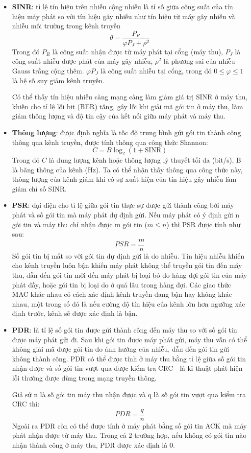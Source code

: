 \documentclass{uetgraduation}
\begin{document}
\begin{itemize}
    \item \textbf{SINR}: tỉ lệ tín hiệu trên nhiễu cộng nhiễu là tỉ số giữa công suất của tín hiệu máy phát so với tín hiệu gây nhiễu như
    tín hiệu từ máy gây nhiễu và nhiễu môi trường trong kênh truyền
    \[
    \theta = \frac{P_R}{\varphi P_J + \rho^2}
    \]
    Trong đó $P_R$ là công suất nhận được từ máy phát tại cổng (máy thu), $P_J$ là công suất nhiễu được phát của máy gây nhiễu, $\rho^2$ là phương sai
    của nhiễu Gauss trắng cộng thêm. $\varphi P_J$ là công suất nhiễu tại cổng, trong đó $0 \leq \varphi \leq 1$ là hệ số suy giảm kênh truyền.

    Có thể thấy tín hiệu nhiễu càng mạng càng làm giảm giá trị SINR ở máy thu, khiến cho tỉ lệ lỗi bit (BER) tăng, gây lỗi khi giải mã gói tin ở máy thu,
    làm giảm thông lượng và độ tin cậy của kết nối giữa máy phát và máy thu.
    \item \textbf{Thông lượng}: được định nghĩa là tốc độ trung bình gửi gói tin thành công thông qua kênh truyền, được tính thông qua công thức Shannon:
    \[
    C = B \log_2(1 + \text{SINR})
    \]
    Trong đó $C$ là dung lượng kênh hoặc thông lượng lý thuyết tối đa (bit/s), B là băng thông của kênh (Hz). Ta có thể nhận thấy thông qua công thức này,
    thông lượng của kênh giảm khi có sự xuất hiện của tín hiệu gây nhiễu làm giảm chỉ số SINR.
    \item \textbf{PSR}: đại diện cho tỉ lệ giữa gói tin thực sự được gửi thành công bởi máy phát và số gói tin mà máy phát dự định gửi. Nếu máy phát có ý
    định gửi n gói tin và máy thu chỉ nhận được m gói tin ($m \leq n$) thì PSR được tính như sau:
    \[
    PSR = \frac{m}{n}
    \]
    Số gói tin bị mất so với gói tin dự định gửi là do nhiễu. Tín hiệu nhiễu khiến cho kênh truyền luôn bận khiến máy phát không thể truyền gói tin đến máy
    thu, dẫn đến gói tin mới đến máy phát bị loại bỏ do hàng đợi gói tin của máy phát đầy, hoặc gói tin bị loại do ở quá lâu trong hàng đợi. Các giao thức
    MAC khác nhau có cách xác định kênh truyền đang bận hay không khác nhau, một trong số đó là nếu cường độ tín hiệu của kênh lớn hơn ngưỡng xác định trước,
    kênh sẽ được xác định là bận.
    \item \textbf{PDR}: là tỉ lệ số gói tin được gửi thành công đến máy thu so với số gói tin được máy phát gửi đi. Sau khi gói tin được máy phát gửi, máy thu
    vẫn có thể không giải mã được gói tin do ảnh hưởng của nhiễu, dẫn đến gói tin gửi không thành công. PDR có thể được tính ở máy thu bằng tỉ lệ giữa số gói
    tin nhận được và số gói tin vượt qua được kiểm tra CRC - là kĩ thuật phát hiện lỗi thường được dùng trong mạng truyền thông.
    
    Giả sử n là số gói tin máy thu nhận được và q là số gói tin vượt qua kiểm tra CRC thì:
    \[
    PDR = \frac{q}{n}
    \]
    Ngoài ra PDR còn có thể được tính ở máy phát bằng số gói tin ACK mà máy phát nhận được từ máy thu. Trong cả 2 trường hợp, nếu không có gói tin nào nhận thành
    công ở máy thu, PDR được xác định là 0.
\end{itemize}
\end{document}
